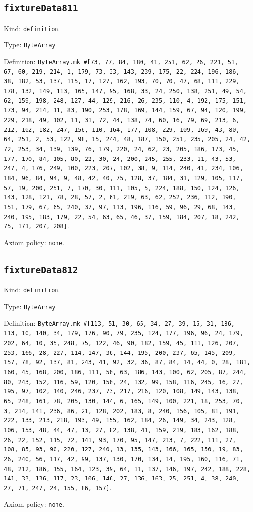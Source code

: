 \documentclass[11pt]{article}
\begin{document}
\subsection*{\texttt{fixtureData811}}
\noindent Kind: \texttt{definition}.\par
\noindent Type: \texttt{ByteArray}.\par
\noindent Definition: \texttt{ByteArray.mk \#[73, 77, 84, 180, 41, 251, 62, 26, 221, 51, 67, 60, 219, 214, 1, 179, 73, 33, 143, 239, 175, 22, 224, 196, 186, 38, 182, 53, 137, 115, 17, 127, 162, 193, 70, 70, 47, 68, 111, 229, 178, 132, 149, 113, 165, 147, 95, 168, 33, 24, 250, 138, 251, 49, 54, 62, 159, 198, 248, 127, 44, 129, 216, 26, 235, 110, 4, 192, 175, 151, 173, 94, 214, 11, 83, 190, 253, 178, 169, 144, 159, 67, 94, 120, 199, 229, 218, 49, 102, 11, 31, 72, 44, 138, 74, 60, 16, 79, 69, 213, 6, 212, 102, 182, 247, 156, 110, 164, 177, 108, 229, 109, 169, 43, 80, 64, 251, 2, 53, 122, 98, 15, 244, 48, 187, 150, 251, 235, 205, 24, 42, 72, 253, 34, 139, 139, 76, 179, 220, 24, 62, 23, 205, 186, 173, 45, 177, 170, 84, 105, 80, 22, 30, 24, 200, 245, 255, 233, 11, 43, 53, 247, 4, 176, 249, 100, 223, 207, 102, 38, 9, 114, 240, 41, 234, 106, 184, 96, 84, 94, 9, 48, 42, 40, 75, 128, 37, 184, 31, 129, 105, 117, 57, 19, 200, 251, 7, 170, 30, 111, 105, 5, 224, 188, 150, 124, 126, 143, 128, 121, 78, 28, 57, 2, 61, 219, 63, 62, 252, 236, 112, 190, 151, 179, 67, 65, 240, 37, 97, 113, 196, 116, 59, 96, 29, 68, 143, 240, 195, 183, 179, 22, 54, 63, 65, 46, 37, 159, 184, 207, 18, 242, 75, 171, 207, 208]}.\par
\noindent Axiom policy: \texttt{none}.\par
\subsection*{\texttt{fixtureData812}}
\noindent Kind: \texttt{definition}.\par
\noindent Type: \texttt{ByteArray}.\par
\noindent Definition: \texttt{ByteArray.mk \#[113, 51, 30, 65, 34, 27, 39, 16, 31, 186, 113, 10, 140, 34, 179, 176, 90, 79, 235, 124, 177, 196, 96, 24, 179, 202, 64, 10, 35, 248, 75, 122, 46, 90, 182, 159, 45, 111, 126, 207, 253, 166, 28, 227, 114, 147, 36, 144, 195, 200, 237, 65, 145, 209, 157, 78, 92, 137, 81, 243, 41, 92, 32, 36, 87, 84, 14, 44, 0, 28, 181, 160, 45, 168, 200, 186, 111, 50, 63, 186, 143, 100, 62, 205, 87, 244, 80, 243, 152, 116, 59, 120, 150, 24, 132, 99, 158, 116, 245, 16, 27, 195, 97, 102, 140, 246, 237, 73, 217, 216, 120, 108, 149, 143, 138, 65, 248, 161, 78, 205, 130, 144, 6, 165, 149, 100, 221, 18, 253, 70, 3, 214, 141, 236, 86, 21, 128, 202, 183, 8, 240, 156, 105, 81, 191, 222, 133, 213, 218, 193, 49, 155, 162, 184, 26, 149, 34, 243, 128, 106, 153, 48, 44, 47, 13, 27, 82, 138, 41, 159, 219, 183, 162, 188, 26, 22, 152, 115, 72, 141, 93, 170, 95, 147, 213, 7, 222, 111, 27, 108, 85, 93, 90, 220, 127, 240, 13, 135, 143, 166, 165, 150, 19, 83, 26, 240, 56, 117, 42, 99, 137, 130, 170, 134, 14, 195, 160, 116, 71, 48, 212, 186, 155, 164, 123, 39, 64, 11, 137, 146, 197, 242, 188, 228, 141, 33, 136, 117, 23, 106, 146, 27, 136, 163, 25, 251, 4, 38, 240, 27, 71, 247, 24, 155, 86, 157]}.\par
\noindent Axiom policy: \texttt{none}.\par
\end{document}
